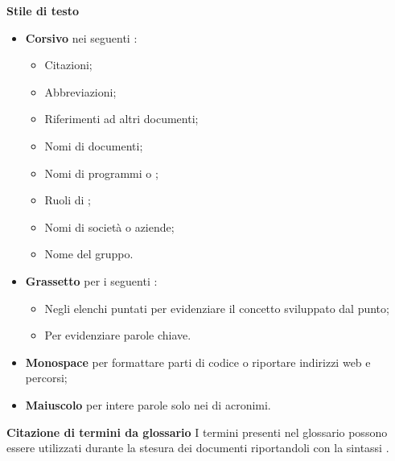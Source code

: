 \textbf{Stile di testo} 
\begin{itemize}
\item \textbf{Corsivo}  nei seguenti :
  \begin{itemize}
  \item Citazioni;
  \item Abbreviazioni;
  \item Riferimenti ad altri documenti;
  \item Nomi di documenti;
  \item Nomi di programmi o ;
  \item Ruoli di ;
  \item Nomi di societ\`a o aziende;
  \item Nome del gruppo.
  \end{itemize}
\item \textbf{Grassetto} per i seguenti :
  \begin{itemize}
  \item Negli elenchi puntati per evidenziare il concetto sviluppato dal punto;
  \item Per evidenziare parole chiave.
  \end{itemize}
\item \textbf{Monospace} per formattare parti di codice o riportare indirizzi web e percorsi;
\item \textbf{Maiuscolo} per intere parole solo nei  di acronimi.
\end{itemize}

\textbf{Citazione di termini da glossario}
I termini presenti nel glossario possono essere utilizzati durante la stesura dei documenti riportandoli con la sintassi .


